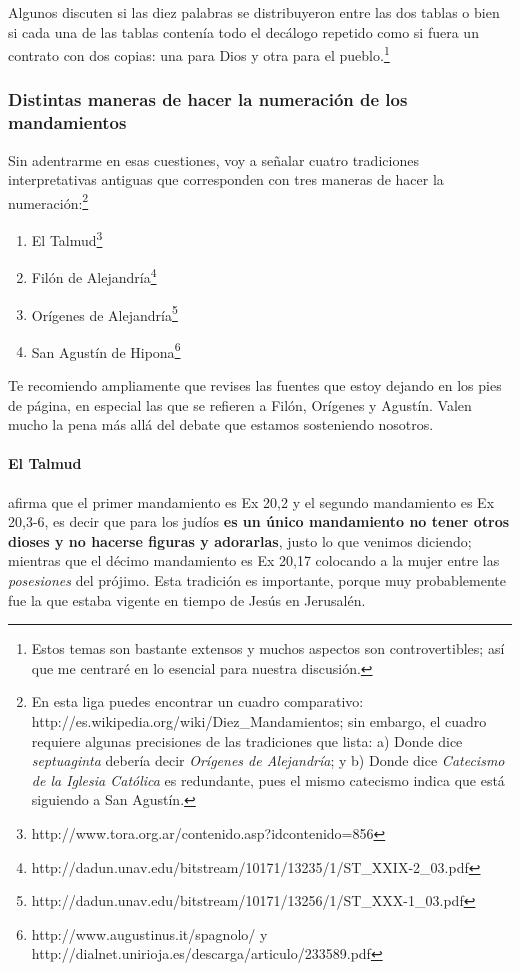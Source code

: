 \documentclass{article}
\begin{document}
Algunos discuten si las diez palabras se distribuyeron entre las dos tablas o bien si cada una de las tablas conten\'{i}a todo el dec\'alogo repetido como si fuera un contrato con dos copias: una para Dios y otra para el pueblo.\footnote{Estos temas son bastante extensos y muchos aspectos son controvertibles; as\'{i} que me centrar\'e en lo esencial para nuestra discusi\'on.}

\subsubsection{Distintas maneras de hacer la numeraci\'on de los mandamientos}

Sin adentrarme en esas cuestiones, voy a se\~nalar cuatro tradiciones interpretativas antiguas que corresponden con tres maneras de hacer la numeraci\'on:\footnote{En esta liga puedes encontrar un cuadro comparativo: http://es.wikipedia.org/wiki/Diez\_Mandamientos; sin embargo, el cuadro requiere algunas precisiones de las tradiciones que lista: a) Donde dice \emph{septuaginta} deber\'{i}a decir \emph{Or\'{i}genes de Alejandr\'{i}a}; y b) Donde dice \emph{Catecismo de la Iglesia Cat\'olica} es redundante, pues el mismo catecismo indica que est\'a siguiendo a San Agust\'{i}n.}

\begin{enumerate}
\item El Talmud\footnote{http://www.tora.org.ar/contenido.asp?idcontenido=856}
\item Fil\'on de Alejandr\'{i}a\footnote{http://dadun.unav.edu/bitstream/10171/13235/1/ST\_XXIX-2\_03.pdf}
\item Or\'{i}genes de Alejandr\'{i}a\footnote{http://dadun.unav.edu/bitstream/10171/13256/1/ST\_XXX-1\_03.pdf}
\item San Agust\'{i}n de Hipona\footnote{http://www.augustinus.it/spagnolo/ y http://dialnet.unirioja.es/descarga/articulo/233589.pdf}
\end{enumerate}

\noindent
Te recomiendo ampliamente que revises las fuentes que estoy dejando en los pies de p\'agina, en especial las que se refieren a Fil\'on, Or\'{i}genes y Agust\'{i}n. Valen mucho la pena m\'as all\'a del debate que estamos sosteniendo nosotros.

\paragraph{El Talmud}

afirma que el primer mandamiento es Ex 20,2 y el segundo mandamiento es Ex 20,3-6, es decir que para los judíos \textbf{es un único mandamiento no tener otros dioses y no hacerse figuras y adorarlas}, justo lo que venimos diciendo; mientras que el d\'ecimo mandamiento es Ex 20,17 colocando a la mujer entre las \emph{posesiones} del pr\'ojimo. Esta tradici\'on es importante, porque muy probablemente fue la que estaba vigente en tiempo de Jes\'us en Jerusal\'en.
\end{document}
